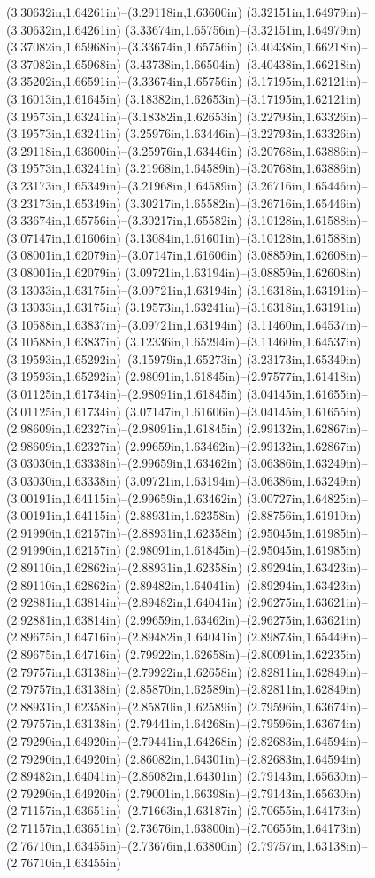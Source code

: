 (3.30632in,1.64261in)--(3.29118in,1.63600in) (3.32151in,1.64979in)--(3.30632in,1.64261in) (3.33674in,1.65756in)--(3.32151in,1.64979in) (3.37082in,1.65968in)--(3.33674in,1.65756in) (3.40438in,1.66218in)--(3.37082in,1.65968in) (3.43738in,1.66504in)--(3.40438in,1.66218in) (3.35202in,1.66591in)--(3.33674in,1.65756in) (3.17195in,1.62121in)--(3.16013in,1.61645in) (3.18382in,1.62653in)--(3.17195in,1.62121in) (3.19573in,1.63241in)--(3.18382in,1.62653in) (3.22793in,1.63326in)--(3.19573in,1.63241in) (3.25976in,1.63446in)--(3.22793in,1.63326in) (3.29118in,1.63600in)--(3.25976in,1.63446in) (3.20768in,1.63886in)--(3.19573in,1.63241in) (3.21968in,1.64589in)--(3.20768in,1.63886in) (3.23173in,1.65349in)--(3.21968in,1.64589in) (3.26716in,1.65446in)--(3.23173in,1.65349in) (3.30217in,1.65582in)--(3.26716in,1.65446in) (3.33674in,1.65756in)--(3.30217in,1.65582in) (3.10128in,1.61588in)--(3.07147in,1.61606in) (3.13084in,1.61601in)--(3.10128in,1.61588in) (3.08001in,1.62079in)--(3.07147in,1.61606in) (3.08859in,1.62608in)--(3.08001in,1.62079in) (3.09721in,1.63194in)--(3.08859in,1.62608in) (3.13033in,1.63175in)--(3.09721in,1.63194in) (3.16318in,1.63191in)--(3.13033in,1.63175in) (3.19573in,1.63241in)--(3.16318in,1.63191in) (3.10588in,1.63837in)--(3.09721in,1.63194in) (3.11460in,1.64537in)--(3.10588in,1.63837in) (3.12336in,1.65294in)--(3.11460in,1.64537in) (3.19593in,1.65292in)--(3.15979in,1.65273in) (3.23173in,1.65349in)--(3.19593in,1.65292in) (2.98091in,1.61845in)--(2.97577in,1.61418in) (3.01125in,1.61734in)--(2.98091in,1.61845in) (3.04145in,1.61655in)--(3.01125in,1.61734in) (3.07147in,1.61606in)--(3.04145in,1.61655in) (2.98609in,1.62327in)--(2.98091in,1.61845in) (2.99132in,1.62867in)--(2.98609in,1.62327in) (2.99659in,1.63462in)--(2.99132in,1.62867in) (3.03030in,1.63338in)--(2.99659in,1.63462in) (3.06386in,1.63249in)--(3.03030in,1.63338in) (3.09721in,1.63194in)--(3.06386in,1.63249in) (3.00191in,1.64115in)--(2.99659in,1.63462in) (3.00727in,1.64825in)--(3.00191in,1.64115in) (2.88931in,1.62358in)--(2.88756in,1.61910in) (2.91990in,1.62157in)--(2.88931in,1.62358in) (2.95045in,1.61985in)--(2.91990in,1.62157in) (2.98091in,1.61845in)--(2.95045in,1.61985in) (2.89110in,1.62862in)--(2.88931in,1.62358in) (2.89294in,1.63423in)--(2.89110in,1.62862in) (2.89482in,1.64041in)--(2.89294in,1.63423in) (2.92881in,1.63814in)--(2.89482in,1.64041in) (2.96275in,1.63621in)--(2.92881in,1.63814in) (2.99659in,1.63462in)--(2.96275in,1.63621in) (2.89675in,1.64716in)--(2.89482in,1.64041in) (2.89873in,1.65449in)--(2.89675in,1.64716in) (2.79922in,1.62658in)--(2.80091in,1.62235in) (2.79757in,1.63138in)--(2.79922in,1.62658in) (2.82811in,1.62849in)--(2.79757in,1.63138in) (2.85870in,1.62589in)--(2.82811in,1.62849in) (2.88931in,1.62358in)--(2.85870in,1.62589in) (2.79596in,1.63674in)--(2.79757in,1.63138in) (2.79441in,1.64268in)--(2.79596in,1.63674in) (2.79290in,1.64920in)--(2.79441in,1.64268in) (2.82683in,1.64594in)--(2.79290in,1.64920in) (2.86082in,1.64301in)--(2.82683in,1.64594in) (2.89482in,1.64041in)--(2.86082in,1.64301in) (2.79143in,1.65630in)--(2.79290in,1.64920in) (2.79001in,1.66398in)--(2.79143in,1.65630in) (2.71157in,1.63651in)--(2.71663in,1.63187in) (2.70655in,1.64173in)--(2.71157in,1.63651in) (2.73676in,1.63800in)--(2.70655in,1.64173in) (2.76710in,1.63455in)--(2.73676in,1.63800in) (2.79757in,1.63138in)--(2.76710in,1.63455in) 